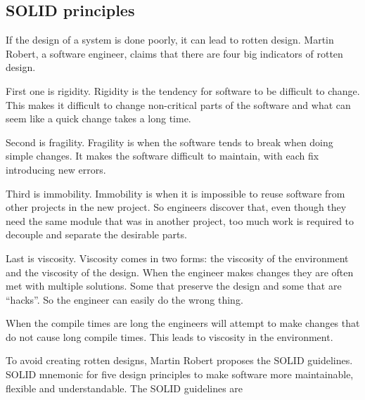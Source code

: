 \documentclass[12pt]{report}
\theoremstyle{definition}
\theoremstyle{theorem}
\begin{document}
\subsection{SOLID principles}

If the design of a system is done poorly, it can lead to rotten design. Martin
Robert, a software engineer, claims that there are four big indicators of rotten
design.

First one is rigidity. Rigidity is the tendency for software to be difficult to
change. This makes it difficult to change non-critical parts of the software and
what can seem like a quick change takes a long time.

Second is fragility. Fragility is when the software tends to break when doing
simple changes. It makes the software difficult to maintain, with each fix
introducing new errors.

Third is immobility. Immobility is when it is impossible to reuse software from
other projects in the new project. So engineers discover that, even though they
need the same module that was in another project, too much work is required to
decouple and separate the desirable parts.

Last is viscosity. Viscosity comes in two forms: the viscosity of the
environment and the viscosity of the design. When the engineer makes changes
they are often met with multiple solutions. Some that preserve the design and
some that are ``hacks''. So the engineer can easily do the wrong thing.

When the compile times are long the engineers will attempt to make changes that
do not cause long compile times. This leads to viscosity in the environment.

To avoid creating rotten designs, Martin Robert proposes the SOLID guidelines.
SOLID mnemonic for five design principles to make software more maintainable,
flexible and understandable. The SOLID guidelines are
\end{document}
